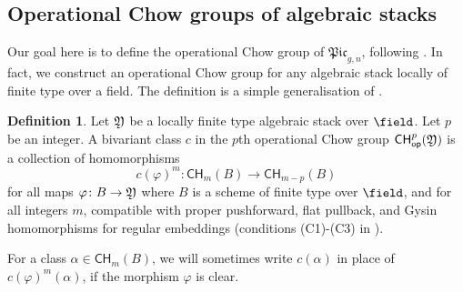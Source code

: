 \documentclass[a4paper,12pt]{article} %
\theoremstyle{definition}
\newtheorem{definition}{Definition} %
\theoremstyle{plain}%
\renewcommand{\phi}{\varphi}
\newcommand{\Picabs}{\mathfrak{Pic}}
\newcommand{\Chow}{\mathsf{CH}}
\newcommand{\CHop}{\Chow_{\mathsf{op}}}
\begin{document}
\subsection{Operational Chow groups of algebraic stacks}\label{ssec:Chopstacks}
Our goal here is to define the operational Chow group of $\Picabs_{g,n}$, following \cite[Chapter 17]{Fulton1984Intersection-th}. 
In fact, we construct an operational Chow group for any algebraic stack locally of finite type over a field. 
The definition is a simple generalisation of  \cite{Fulton1984Intersection-th}. 

\begin{definition}
    Let $\frak Y$ be a locally finite type algebraic stack over ${\field}$. Let $p$ be an integer. A bivariant class $c$ in the $p$th operational Chow group $\CHop^p(\frak Y)$ is a collection of  homomorphisms
\[c(\phi)^{m}\colon \Chow_m(B) \to \Chow_{m-p}(B)\]
for all maps $\phi \colon B \to \frak Y$ where $B$ is a scheme of finite type over ${\field}$, and for all integers $m$, compatible with proper pushforward, flat pullback, and Gysin homomorphisms for regular embeddings (conditions (C1)-(C3) in \cite[Section 17.1]{Fulton1984Intersection-th}). 
\end{definition}
For a class $\alpha \in \Chow_m(B)$, we will sometimes write $c(\alpha)$ in place of $c(\phi)^m(\alpha)$, if the morphism $\phi$ is clear. 

\end{document}
